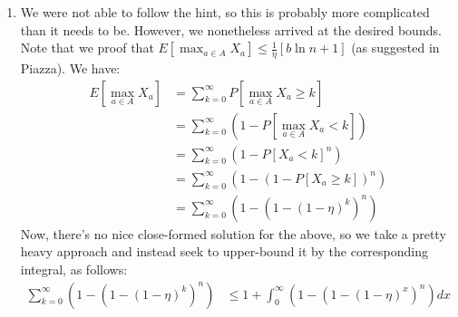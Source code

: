 \documentclass[12pt]{exam}
\newtheorem{lemma}[theorem]{Lemma}
\begin{document}
\begin{questions}
\begin{solution}
\begin{enumerate}[label=(\alph*)]
      \begin{lemma}
        The best fixed-action sequence maximizing the total perturbed reward has regret bounded above by $\max_{a \in A} X_a$.
      \end{lemma}
      \begin{proof}
        We can proof this directly. The regret is given as:
        \begin{align*}
          \underbrace{\max_{a\in A} \sum_{t=1}^T r^t(a)}_{\text{best fixed action}} - \underbrace{\sum_{t=1}^T r^t\left(\arg \max_{a\in A} \{X_a + \sum_{u=1}^T r^t(a)\}\right)}_{\text{reward for best fixed action maximizing perturbed reward}} &= \max_{a\in A} \sum_{t=1}^T r^t(a) - \max_{a\in A} \{X_a + \sum_{u=1}^T r^t(a)\} \\
          \leq \max_{a \in A} X_a
        \end{align*}
      \end{proof}
      Putting the two results above together, we arrive at the conclusions that:
      \begin{lemma}
        The regret of our proposed algorithm is bounded above by $\max_{a \in A} X_a$.
      \end{lemma}
    \item
      We were not able to follow the hint, so this is probably more complicated than it needs to be. However, we nonetheless arrived at the desired bounds. Note that we proof that $E[\max_{a \in A} X_a] \leq \frac{1}{\eta} [b \ln n + 1]$ (as suggested in Piazza). We have:
      \begin{align*}
        E[\max_{a \in A} X_a] &= \sum_{k=0}^{\infty} P[\max_{a \in A} X_a \geq k] \tag{Definition of expectation for non-negative r.v} \\
        &= \sum_{k=0}^{\infty} (1 - P[\max_{a \in A} X_a < k]) \tag{Complement} \\
        &= \sum_{k=0}^{\infty} (1 - P[X_a < k]^n) \tag{All $X_a$ must be less than $k$, and they are IID} \\
        &= \sum_{k=0}^{\infty} (1 - (1 - P[X_a \geq k])^n) \tag{Complement} \\
        &= \sum_{k=0}^{\infty} (1 - (1 - (1-\eta)^k)^n) \tag{only if first $k$ flips are tails} 
      \end{align*}
      Now, there's no nice close-formed solution for the above, so we take a pretty heavy approach and instead seek to upper-bound it by the corresponding integral, as follows:
      \begin{align*}
        \sum_{k=0}^{\infty} (1 - (1 - (1-\eta)^k)^n) &\leq 1 + \int_{0}^\infty (1 - (1 - (1-\eta)^x)^n) dx \\

\end{align*}
\end{enumerate}
\end{solution}
\end{questions}
\end{document}
